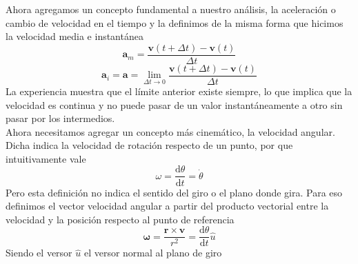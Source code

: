 \documentclass[a4paper]{article}
\numberwithin{equation}{section}
\begin{document}
        Ahora agregamos un concepto fundamental a nuestro análisis, la aceleración o cambio de velocidad en el tiempo y la definimos de la misma forma que hicimos la velocidad media e instantánea
        \begin{equation}
            \boldsymbol{a}_{m} = \frac{\boldsymbol{v}(t + \Delta t) - \boldsymbol{v}(t)}{\Delta t}
        \end{equation}
        \begin{equation}
            \boldsymbol{a}_{i} = \boldsymbol{a} = \lim_{\Delta t \to 0} \frac{\boldsymbol{v}(t + \Delta t) - \boldsymbol{v}(t)}{\Delta t}
        \end{equation}
        La experiencia muestra que el límite anterior existe siempre, lo que implica que la velocidad es continua y no puede pasar de un valor instantáneamente a otro sin pasar por los intermedios.\\
        Ahora necesitamos agregar un concepto más cinemático, la velocidad angular. Dicha indica la velocidad de rotación respecto de un punto, por que intuitivamente vale
        \begin{equation}
            \omega = \frac{\mathrm{d}\theta}{\mathrm{d}t} = \dot{\theta}
        \end{equation}
        Pero esta definición no indica el sentido del giro o el plano donde gira. Para eso definimos el vector velocidad angular a partir del producto vectorial entre la velocidad y la posición respecto al punto de referencia
        \begin{equation}
            \boldsymbol{\omega} = \frac{\boldsymbol{r} \times \boldsymbol{v}}{r^2} = \frac{\mathrm{d}\theta}{\mathrm{d}t} \hat{u}
        \end{equation}
        Siendo el versor $\hat{u}$ el versor normal al plano de giro
\end{document}
